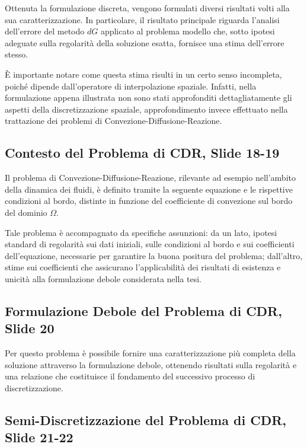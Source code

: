 \documentclass[12pt]{article}
\begin{document}
    Ottenuta la formulazione discreta, vengono formulati diversi risultati volti alla sua caratterizzazione. In particolare, il risultato principale riguarda l'analisi dell'errore del metodo $dG$ applicato al problema modello che, sotto ipotesi adeguate sulla regolarità della soluzione esatta, fornisce una stima dell'errore stesso.

    È importante notare come questa stima risulti in un certo senso incompleta, poiché dipende dall'operatore di interpolazione spaziale. Infatti, nella formulazione appena illustrata non sono stati approfonditi dettagliatamente gli aspetti della discretizzazione spaziale, approfondimento invece effettuato nella trattazione dei problemi di Convezione-Diffusione-Reazione.

    \subsection{Contesto del Problema di CDR, Slide 18-19}

    Il problema di Convezione-Diffusione-Reazione, rilevante ad esempio nell'ambito della dinamica dei fluidi, è definito tramite la seguente equazione e le rispettive condizioni al bordo, distinte in funzione del coefficiente di convezione sul bordo del dominio $\Omega$.

    Tale problema è accompagnato da specifiche assunzioni: da un lato, ipotesi standard di regolarità sui dati iniziali, sulle condizioni al bordo e sui coefficienti dell'equazione, necessarie per garantire la buona positura del problema; dall'altro, stime sui coefficienti che assicurano l'applicabilità dei risultati di esistenza e unicità alla formulazione debole considerata nella tesi.

    \subsection{Formulazione Debole del Problema di CDR, Slide 20}

    Per questo problema è possibile fornire una caratterizzazione più completa della soluzione attraverso la formulazione debole, ottenendo risultati sulla regolarità e una relazione che costituisce il fondamento del successivo processo di discretizzazione.

    \subsection{Semi-Discretizzazione del Problema di CDR, Slide 21-22}
\end{document}
